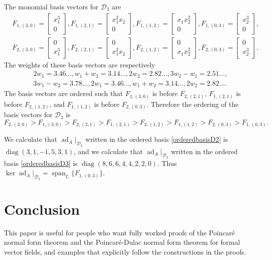 \documentclass{article}
\newcommand{\diag}{\operatorname{diag}}
\newcommand{\ad}{\operatorname{ad}}
\newcommand{\spanning}{\operatorname{span}}
\begin{document}
The monomial basis vectors for $\mathscr{D}_3$ are
\[
\begin{split}
&F_{1,(3,0)}=\begin{bmatrix}x_1^3\\0\end{bmatrix},
F_{1,(2,1)}=\begin{bmatrix}x_1^2 x_2\\0\end{bmatrix},
F_{1,(1,2)}=\begin{bmatrix}x_1 x_2^2\\0\end{bmatrix},
F_{1,(0,3)}=\begin{bmatrix}x_2^3\\0\end{bmatrix},\\
&F_{2,(3,0)}=\begin{bmatrix}0\\x_1^3\end{bmatrix},
F_{2,(2,1)}=\begin{bmatrix}0\\x_1^2 x_2\end{bmatrix},
F_{2,(1,2)}=\begin{bmatrix}0\\x_1 x_2^2\end{bmatrix},
F_{2,(0,3)}=\begin{bmatrix}0\\x_2^3\end{bmatrix}.
\end{split}
\]
The weights of these basis vectors are respectively
\[
\begin{split}
&2w_1=3.46\ldots, w_1+w_2=3.14\ldots, 2w_2=2.82\ldots,3w_2-w_1=2.51\ldots,\\
&3w_1-w_2=3.78\ldots, 2w_1=3.46\ldots, w_1+w_2=3.14\ldots, 2w_2=2.82\ldots.
\end{split}
\]
The basis vectors are ordered such that $F_{1,(3,0)}$ is before $F_{2,(2,1)}$,
$F_{1,(2,1)}$ is before $F_{2,(1,2)}$, and $F_{1,(1,2)}$ is before $F_{2,(0,3)}$.
Therefore the ordering of the basis vectors for $\mathscr{D}_3$ is
\begin{equation}
\label{orderedbasisD3}
F_{2,(3,0)}>F_{1,(3,0)}>F_{2,(2,1)}>F_{1,(2,1)}>
F_{2,(1,2)}>F_{1,(1,2)}>F_{2,(0,3)}>F_{1,(0,3)}.
\end{equation}

We calculate that $\ad_A|_{\mathscr{D}_2}$ written in the ordered basis
\eqref{orderedbasisD2} is $\diag(3,1,-1,5,3,1)$, and
we calculate that
$\ad_A|_{\mathscr{D}_3}$ written in the ordered basis \eqref{orderedbasisD3} is $\diag(8,6,6,4,4,2,2,0)$.
Thus $\ker \ad_A|_{\mathscr{D}_3}=\spanning_{\mathbb{C}}\{F_{1,(0,3)}\}$.

\section{Conclusion}
This paper is useful for people who want fully worked proofs of the Poincar\'e normal form theorem and the Poincar\'e-Dulac normal form theorem for formal vector fields, and examples that explicitly follow the constructions in the proofs.




\end{document}

